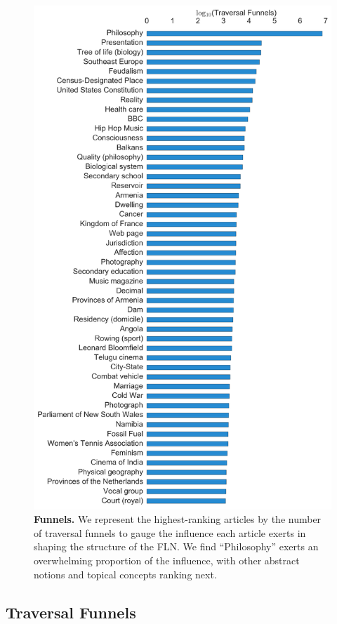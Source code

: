 \documentclass[pre,twocolumn,twoside,superscriptaddress,floatfix]{revtex4-1}
\begin{document}
{\begin{figure}[tp!]
  \includegraphics[width=\columnwidth]{fig011_top_funnels.pdf}
  \caption{
    \textbf{Funnels.}
We represent the highest-ranking articles by the number of traversal 
funnels to gauge the influence each article exerts in shaping the 
structure of the FLN. 
We find ``Philosophy'' exerts an overwhelming proportion
of the influence, with other abstract notions and topical concepts ranking
next.}
  \label{fig:Funnels}
\end{figure}

\subsection{Traversal Funnels}
\label{Traversal Funnels}

}
\end{document}
